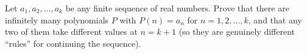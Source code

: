 Let $a_1,a_2,\dots,a_k$ be any finite sequence of real numbers. Prove that there are infinitely many polynomials $P$ with $P(n)=a_n$ for $n=1,2,\dots,k$, and that any two of them take different values at $n=k+1$ (so they are genuinely different ``rules'' for continuing the sequence).
